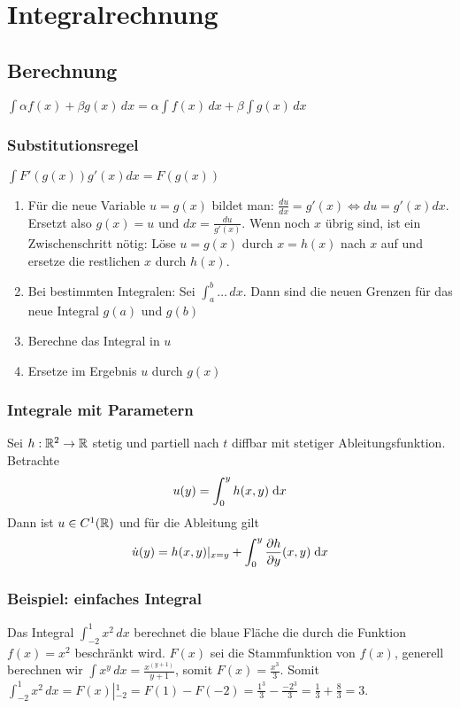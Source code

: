 \section{Integralrechnung}
\subsection{Berechnung}
$\int \alpha f(x) + \beta g(x)\,dx = \alpha \int f(x)\,dx + \beta \int g(x)\,dx$

\subsubsection{Substitutionsregel}
$\int F'(g(x)) g'(x)dx = F(g(x))$


\begin{enumerate}
	\item Für die neue Variable $u = g(x)$ bildet man: $\frac{du}{dx} = g'(x)
	\Leftrightarrow du = g'(x)dx$. Ersetzt also $g(x) = u$ und $dx =
	\frac{du}{g'(x)}$. Wenn noch $x$ übrig sind, ist ein Zwischenschritt nötig:
	Löse $u = g(x)$ durch $x = h(x)$ nach $x$ auf und ersetze die restlichen $x$
	durch $h(x)$.
	\item Bei bestimmten Integralen: Sei $\int_a^b \ldots \,dx$. Dann sind die neuen
	Grenzen für das neue Integral $g(a)$ und $g(b)$
	\item Berechne das Integral in $u$
	\item Ersetze im Ergebnis $u$ durch $g(x)$
\end{enumerate}


\subsubsection{Integrale mit Parametern}
	Sei $h: \mathbb{R}^2 \to \mathbb{R}$ stetig und partiell nach $t$ diffbar mit stetiger Ableitungsfunktion. Betrachte 
	\[ u(y) = \int_0^y h(x,y) \; \mathrm{d} x \]
	Dann ist $u \in C^1(\mathbb{R})$ und für die Ableitung gilt
	\[ \dot{u}(y) = h(x,y)|_{x=y} + \int_0^y \frac{\partial h}{\partial y} (x,y) \; \mathrm{d} x \]

\subsubsection{Beispiel: einfaches Integral}
Das Integral $\int_{-2}^1 x^2 \,dx$ berechnet die blaue Fläche die durch die Funktion $f(x) = x^2$ beschränkt wird.
$F(x)$ sei die Stammfunktion von $f(x)$,  generell berechnen wir $\int x^y \,dx = \frac{x^{(y+1)}}{y+1}$, somit $F(x) = \frac{x^3}{3}$.
Somit $\int_{-2}^1 x^2 \,dx = F(x) \left |_{-2}^1 \right. = F(1) - F(-2) =  \frac{1^3}{3} -  \frac{-2^3}{3} = \frac{1}{3} +  \frac{8}{3} = 3.$

